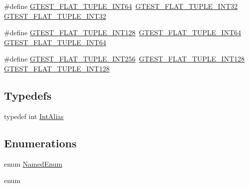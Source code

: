 \begin{DoxyCompactItemize}
\item 
\#define \mbox{\hyperlink{_obj__test_2lib_2googletest-master_2googletest_2test_2gtest__unittest_8cc_a505487ba755aefa89ddfdc9127621c11}{G\+T\+E\+S\+T\+\_\+\+F\+L\+A\+T\+\_\+\+T\+U\+P\+L\+E\+\_\+\+I\+N\+T64}}~\mbox{\hyperlink{_obj__test_2lib_2googletest-master_2googletest_2test_2gtest__unittest_8cc_a1c7baa94acbbb0d0ef250772fdad3972}{G\+T\+E\+S\+T\+\_\+\+F\+L\+A\+T\+\_\+\+T\+U\+P\+L\+E\+\_\+\+I\+N\+T32}} \mbox{\hyperlink{_obj__test_2lib_2googletest-master_2googletest_2test_2gtest__unittest_8cc_a1c7baa94acbbb0d0ef250772fdad3972}{G\+T\+E\+S\+T\+\_\+\+F\+L\+A\+T\+\_\+\+T\+U\+P\+L\+E\+\_\+\+I\+N\+T32}}
\item 
\#define \mbox{\hyperlink{_obj__test_2lib_2googletest-master_2googletest_2test_2gtest__unittest_8cc_a0ff3eef0b1e2abfee41bdab9631f41ae}{G\+T\+E\+S\+T\+\_\+\+F\+L\+A\+T\+\_\+\+T\+U\+P\+L\+E\+\_\+\+I\+N\+T128}}~\mbox{\hyperlink{_obj__test_2lib_2googletest-master_2googletest_2test_2gtest__unittest_8cc_a505487ba755aefa89ddfdc9127621c11}{G\+T\+E\+S\+T\+\_\+\+F\+L\+A\+T\+\_\+\+T\+U\+P\+L\+E\+\_\+\+I\+N\+T64}} \mbox{\hyperlink{_obj__test_2lib_2googletest-master_2googletest_2test_2gtest__unittest_8cc_a505487ba755aefa89ddfdc9127621c11}{G\+T\+E\+S\+T\+\_\+\+F\+L\+A\+T\+\_\+\+T\+U\+P\+L\+E\+\_\+\+I\+N\+T64}}
\item 
\#define \mbox{\hyperlink{_obj__test_2lib_2googletest-master_2googletest_2test_2gtest__unittest_8cc_ac53eae6d18fe053245d04c88c2122882}{G\+T\+E\+S\+T\+\_\+\+F\+L\+A\+T\+\_\+\+T\+U\+P\+L\+E\+\_\+\+I\+N\+T256}}~\mbox{\hyperlink{_obj__test_2lib_2googletest-master_2googletest_2test_2gtest__unittest_8cc_a0ff3eef0b1e2abfee41bdab9631f41ae}{G\+T\+E\+S\+T\+\_\+\+F\+L\+A\+T\+\_\+\+T\+U\+P\+L\+E\+\_\+\+I\+N\+T128}} \mbox{\hyperlink{_obj__test_2lib_2googletest-master_2googletest_2test_2gtest__unittest_8cc_a0ff3eef0b1e2abfee41bdab9631f41ae}{G\+T\+E\+S\+T\+\_\+\+F\+L\+A\+T\+\_\+\+T\+U\+P\+L\+E\+\_\+\+I\+N\+T128}}
\end{DoxyCompactItemize}
\subsection*{Typedefs}
\begin{DoxyCompactItemize}
\item 
typedef int \mbox{\hyperlink{_obj__test_2lib_2googletest-master_2googletest_2test_2gtest__unittest_8cc_a89319972d5a831dd6877a3e502ec57ff}{Int\+Alias}}
\end{DoxyCompactItemize}
\subsection*{Enumerations}
\begin{DoxyCompactItemize}
\item 
enum \mbox{\hyperlink{_obj__test_2lib_2googletest-master_2googletest_2test_2gtest__unittest_8cc_ae0610bad70a3b53c94ee9db54f6f732b}{Named\+Enum}} 
\item 
enum 
\end{DoxyCompactItemize}
